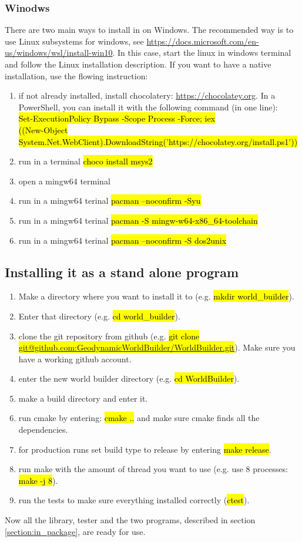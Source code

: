 \documentclass{book}
\begin{document}
\subsubsection{Winodws}
There are two main ways to install in on Windows. The recommended way is to use Linux subsystems for windows, see \url{https://docs.microsoft.com/en-us/windows/wsl/install-win10}. In this case, start the linux in windows terminal and follow the Linux installation description. If you want to have a native installation, use the flowing instruction: 
\begin{enumerate}
    \item if not already installed, install chocolatery: \url{https://chocolatey.org}. In a PowerShell, you can install it with the following command (in one line): \\ \hl{Set-ExecutionPolicy Bypass -Scope Process -Force; iex \\ ((New-Object System.Net.WebClient).DownloadString('https://chocolatey.org/install.ps1'))}
    \item run in a terminal \hl{choco install msys2}
    \item open a mingw64 terminal
    \item run in a mingw64 terinal \hl{pacman --noconfirm -Syu}
    \item run in a mingw64 terinal \hl{pacman -S mingw-w64-x86\_64-toolchain}
    \item run in a mingw64 terinal \hl{pacman --noconfirm -S dos2unix}
\end{enumerate}

\subsection{Installing it as a stand alone program}
\label{subsection:install_stand_aline}
\begin{enumerate}
    \item Make a directory where you want to install it to (e.g. \hl{mkdir world\_builder}).
    \item Enter that directory (e.g. \hl{cd world\_builder}).
    \item clone the git repository from github (e.g. \hl{git clone  \\ \hbox{\url{ git@github.com:GeodynamicWorldBuilder/WorldBuilder.git}}}). Make sure you have a working github account.
    \item enter the new world builder directory (e.g. \hl{cd WorldBuilder}).
    \item make a build directory and enter it.
    \item run cmake by entering: \hl{cmake ..} and make sure cmake finds all the dependencies.
    \item for production runs set build type to release by entering \hl{make release}.
    \item run make with the amount of thread you want to use (e.g. use 8 processes: \hl{make -j 8}).
    \item run the tests to make sure everything installed correctly (\hl{ctest}).
\end{enumerate}
Now all the library, tester and the two programs, described in section \ref{section:in_package}, are ready for use.
\end{document}
